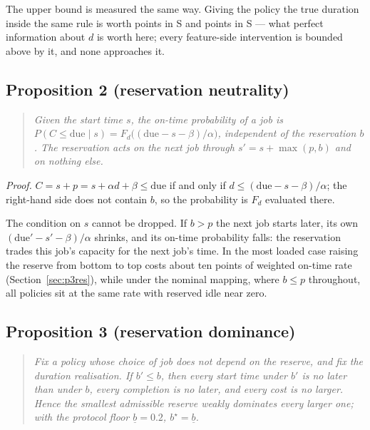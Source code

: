 The upper bound is measured the same way. Giving the policy the true duration inside the same
rule is worth \slotPOracleGapSTwoPt{} points in S\slotCaseTwo{} and \slotPOracleGapSThreePt{} points
in S\slotCaseThree{} --- what perfect information about $d$ is worth here; every feature-side
intervention is bounded above by it, and none approaches it.

\subsection*{Proposition 2 (reservation neutrality)}

\begin{quote}
\itshape
Given the start time $s$, the on-time probability of a job is
$P(C\le \mathrm{due}\mid s)=F_d\bigl((\mathrm{due}-s-\beta)/\alpha\bigr)$, independent of the
reservation $b$. The reservation acts on the next job through $s'=s+\max(p,b)$ and on nothing else.
\end{quote}

\noindent\emph{Proof.} $C=s+p=s+\alpha d+\beta\le\mathrm{due}$ if and only if
$d\le(\mathrm{due}-s-\beta)/\alpha$; the right-hand side does not contain $b$, so the probability is
$F_d$ evaluated there.

The condition on $s$ cannot be dropped. If $b>p$ the next job starts later, its own
$(\mathrm{due}'-s'-\beta)/\alpha$ shrinks, and its on-time probability falls: the reservation
trades this job's capacity for the next job's time. In the most loaded case raising the reserve
from bottom to top costs about ten points of weighted on-time rate (Section~\ref{sec:p3res}),
while under the nominal mapping, where $b\le p$ throughout, all policies sit at the same rate
with reserved idle near zero.

\subsection*{Proposition 3 (reservation dominance)}

\begin{quote}
\itshape
Fix a policy whose choice of job does not depend on the reserve, and fix the duration
realisation. If $b'\le b$, then every start time under $b'$ is no later than under $b$, every
completion is no later, and every cost is no larger. Hence the smallest admissible reserve
weakly dominates every larger one; with the protocol floor $\underline{b}=0.2$,
$b^{\star}=\underline{b}$.
\end{quote}

